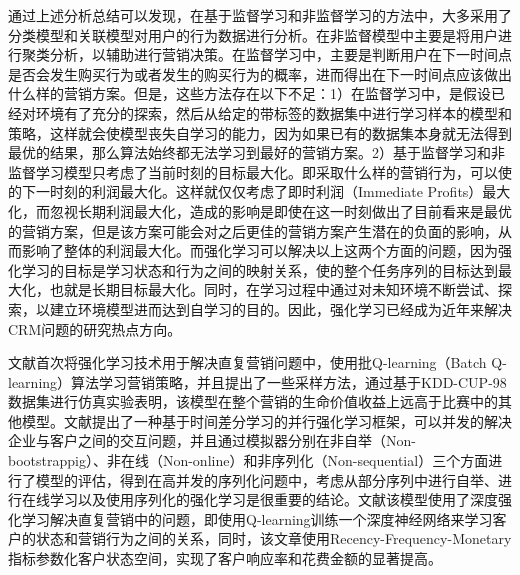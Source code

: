 通过上述分析总结可以发现，在基于监督学习和非监督学习的方法中，大多采用了分类模型和关联模型对用户的行为数据进行分析。在非监督模型中主要是将用户进行聚类分析，以辅助进行营销决策。在监督学习中，主要是判断用户在下一时间点是否会发生购买行为或者发生的购买行为的概率，进而得出在下一时间点应该做出什么样的营销方案。但是，这些方法存在以下不足：1）在监督学习中，是假设已经对环境有了充分的探索，然后从给定的带标签的数据集中进行学习样本的模型和策略，这样就会使模型丧失自学习的能力，因为如果已有的数据集本身就无法得到最优的结果，那么算法始终都无法学习到最好的营销方案。2）基于监督学习和非监督学习模型只考虑了当前时刻的目标最大化。即采取什么样的营销行为，可以使的下一时刻的利润最大化。这样就仅仅考虑了即时利润（Immediate Profits）最大化，而忽视长期利润最大化，造成的影响是即使在这一时刻做出了目前看来是最优的营销方案，但是该方案可能会对之后更佳的营销方案产生潜在的负面的影响，从而影响了整体的利润最大化。而强化学习可以解决以上这两个方面的问题，因为强化学习的目标是学习状态和行为之间的映射关系，使的整个任务序列的目标达到最大化，也就是长期目标最大化。同时，在学习过程中通过对未知环境不断尝试、探索，以建立环境模型进而达到自学习的目的。因此，强化学习已经成为近年来解决CRM问题的研究热点方向。

文献\citep{pednault2002sequential}首次将强化学习技术用于解决直复营销问题中，使用批Q-learning（Batch Q-learning）算法学习营销策略，并且提出了一些采样方法，通过基于KDD-CUP-98数据集进行仿真实验表明，该模型在整个营销的生命价值收益上远高于比赛中的其他模型。文献\citep{silver2013concurrent}提出了一种基于时间差分学习的并行强化学习框架，可以并发的解决企业与客户之间的交互问题，并且通过模拟器分别在非自举（Non-bootstrappig）、非在线（Non-online）和非序列化（Non-sequential）三个方面进行了模型的评估，得到在高并发的序列化问题中，考虑从部分序列中进行自举、进行在线学习以及使用序列化的强化学习是很重要的结论。文献\citep{tkachenko2015autonomous}该模型使用了深度强化学习解决直复营销中的问题，即使用Q-learning训练一个深度神经网络来学习客户的状态和营销行为之间的关系，同时，该文章使用Recency-Frequency-Monetary指标参数化客户状态空间，实现了客户响应率和花费金额的显著提高。

